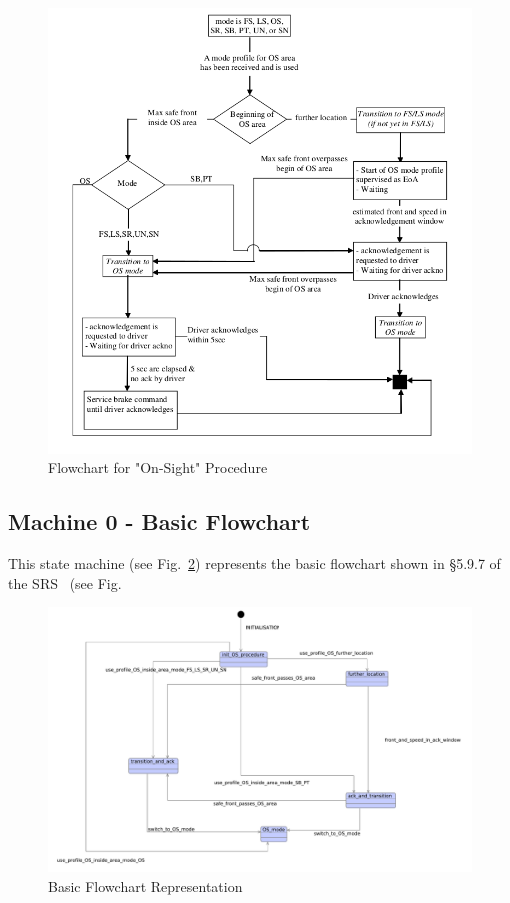 \documentclass{template/openetcs_article}
\begin{document}
\begin{figure}[ht]
  \centering
  \includegraphics[width=.75\textwidth]{FlowChart}
  \caption{Flowchart for "On-Sight" Procedure}
  \label{fig:flowchart-OS-mode}
\end{figure}

\subsection{Machine 0 - Basic Flowchart}
\label{sec:machine-0-basic}

This state machine (see Fig.~\ref{fig:basic-flowchart}) represents the basic
flowchart shown in §5.9.7 of the SRS~\cite{SRS-026-330} (see Fig.~




\begin{figure}[ht]
  \centering
  \includegraphics[width=.85\textwidth]{m0_basic_flowchart_on_sight_procedure}
  \caption{Basic Flowchart Representation}
  \label{fig:basic-flowchart}
\end{figure}
\end{document}
